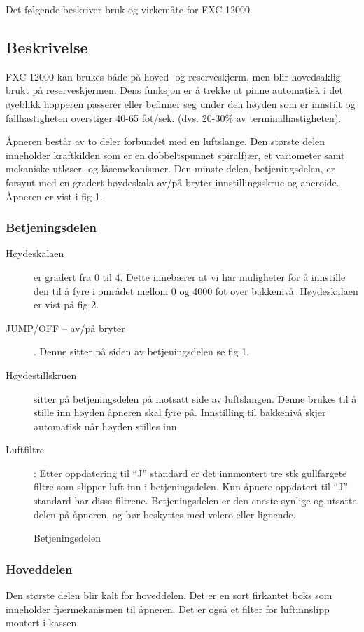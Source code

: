 Det følgende beskriver bruk og virkemåte for FXC 12000.

\subsection{Beskrivelse}
FXC 12000 kan brukes både på hoved- og reserveskjerm, men blir hovedsaklig brukt på reserveskjermen. Dens funksjon er å trekke ut pinne automatisk i det øyeblikk hopperen passerer eller befinner seg under den høyden som er innstilt og fallhastigheten overstiger 40-65 fot/sek. (dvs. 20-30\% av terminalhastigheten).

Åpneren består av to deler forbundet med en luftslange. Den største delen inneholder kraftkilden som er en dobbeltspunnet spiralfjær, et variometer samt mekaniske utløser- og låsemekanismer. Den minste delen, betjeningsdelen, er forsynt med en gradert høydeskala av/på bryter innstillingsskrue og aneroide. Åpneren er vist i fig 1.

\subsubsection{Betjeningsdelen}
\begin{description}
\item[Høydeskalaen] er gradert fra 0 til 4. Dette innebærer at vi har muligheter for å innstille den til å fyre i området mellom 0 og 4000 fot over bakkenivå. Høydeskalaen er vist på fig 2.
\item[JUMP/OFF – av/på bryter]. Denne sitter på siden av betjeningsdelen se fig 1.
\item[Høydestillskruen] sitter på betjeningsdelen på motsatt side av luftslangen. Denne brukes til å stille inn høyden åpneren skal fyre på. Innstilling til bakkenivå skjer automatisk når høyden stilles inn.
\item[Luftfiltre]: Etter oppdatering til ``J'' standard er det innmontert tre stk gullfargete filtre som slipper luft inn i betjeningsdelen. Kun åpnere oppdatert til ``J'' standard har disse filtrene. Betjeningsdelen er den eneste synlige og utsatte delen på åpneren, og bør beskyttes med velcro eller lignende.
\end{description}

\begin{figure}
	\caption{Betjeningsdelen}
\end{figure}

\subsubsection{Hoveddelen}
Den største delen blir kalt for hoveddelen. Det er en sort firkantet boks som inneholder fjærmekanismen til åpneren. Det er også et filter for luftinnslipp montert i kassen.

